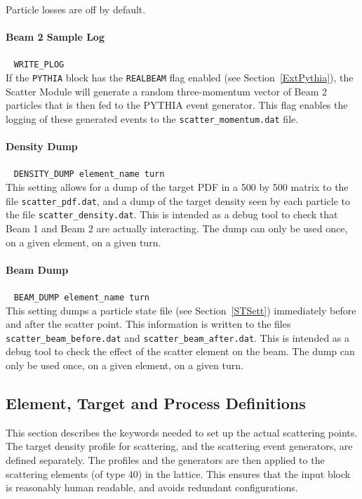 Particle losses are off by default.

\paragraph{Beam 2 Sample Log}~ \texttt{WRITE\_PLOG}\\

If the \texttt{PYTHIA} block has the \texttt{REALBEAM} flag enabled (see Section~\ref{ExtPythia}), the Scatter Module will generate a random three-momentum vector of Beam 2 particles that is then fed to the PYTHIA event generator.
This flag enables the logging of these generated events to the \texttt{scatter\_momentum.dat} file.

\paragraph{Density Dump}~ \texttt{DENSITY\_DUMP element\_name turn}\\

This setting allows for a dump of the target PDF in a 500 by 500 matrix to the file \texttt{scatter\_pdf.dat}, and a dump of the target density seen by each particle to the file \texttt{scatter\_density.dat}.
This is intended as a debug tool to check that Beam 1 and Beam 2 are actually interacting.
The dump can only be used once, on a given element, on a given turn.

\paragraph{Beam Dump}~ \texttt{BEAM\_DUMP element\_name turn}\\

This setting dumps a particle state file (see Section~\ref{STSett}) immediately before and after the scatter point.
This information is written to the files \texttt{scatter\_beam\_before.dat} and \texttt{scatter\_beam\_after.dat}.
This is intended as a debug tool to check the effect of the scatter element on the beam.
The dump can only be used once, on a given element, on a given turn.

\subsection{Element, Target and Process Definitions}

This section describes the keywords needed to set up the actual scattering points.
The target density profile for scattering, and the scattering event generators, are defined separately.
The profiles and the generators are then applied to the scattering elements (of type 40) in the lattice.
This ensures that the input block is reasonably human readable, and avoids redundant configurations.

